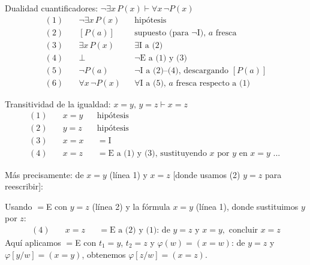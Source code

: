 \begin{ejemplo}{Dualidad cuantificadores: $\neg\exists x\, P(x) \vdash \forall x\, \neg P(x)$}{}
\begin{align*}
(1)\quad &\neg\exists x\, P(x) && \text{hipótesis} \\
(2)\quad &[P(a)] && \text{supuesto (para } \neg\mathrm{I} \text{), } a \text{ fresca} \\
(3)\quad &\exists x\, P(x) && \exists\mathrm{I} \text{ a (2)} \\
(4)\quad &\bot && \neg\mathrm{E} \text{ a (1) y (3)} \\
(5)\quad &\neg P(a) && \neg\mathrm{I} \text{ a (2)--(4), descargando } [P(a)] \\
(6)\quad &\forall x\, \neg P(x) && \forall\mathrm{I} \text{ a (5), } a \text{ fresca respecto a (1)}
\end{align*}
\end{ejemplo}

\begin{ejemplo}{Transitividad de la igualdad: $x=y,\, y=z \vdash x=z$}{}
\begin{align*}
(1)\quad & x = y && \text{hipótesis} \\
(2)\quad & y = z && \text{hipótesis} \\
(3)\quad & x = x && {=}\mathrm{I} \\
(4)\quad & x = z && {=}\mathrm{E} \text{ a (1) y (3), sustituyendo } x \text{ por } y \text{ en } x = y \text{ ... }
\end{align*}

Más precisamente: de $x = y$ (línea 1) y $x = z$ [donde usamos (2) $y=z$ para reescribir]:

Usando ${=}$E con $y = z$ (línea 2) y la fórmula $x = y$ (línea 1), donde sustituimos $y$ por $z$:
\begin{align*}
(4)\quad & x = z && {=}\mathrm{E} \text{ a (2) y (1): de } y=z \text{ y } x=y, \text{ concluir } x=z
\end{align*}
Aquí aplicamos ${=}$E con $t_1 = y$, $t_2 = z$ y $\varphi(w) = (x = w)$: de $y = z$ y $\varphi[y/w] = (x=y)$, obtenemos $\varphi[z/w] = (x = z)$.
\end{ejemplo}

